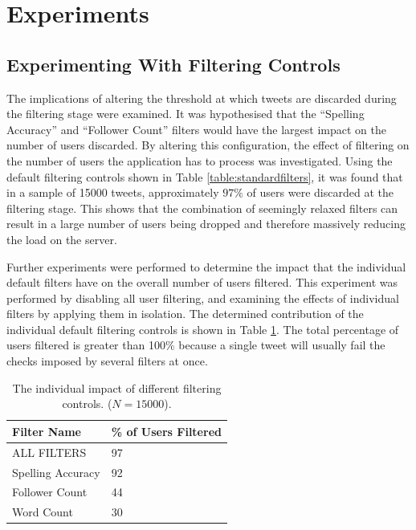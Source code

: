 \documentclass{l4proj}
\begin{document}
\section{Experiments}
    
    \subsection{Experimenting With Filtering Controls}
    The implications of altering the threshold at which tweets are discarded during the filtering stage were examined. It was hypothesised that the ``Spelling Accuracy'' and ``Follower Count'' filters would have the largest impact on the number of users discarded. By altering this configuration, the effect of filtering on the number of users the application has to process was investigated. Using the default filtering controls shown in Table \ref{table:standardfilters}, it was found that in a sample of 15000 tweets, approximately $97\%$ of users were discarded at the filtering stage. This shows that the combination of seemingly relaxed filters can result in a large number of users being dropped and therefore massively reducing the load on the server. 
    
Further experiments were performed to determine the impact that the individual default filters have on the overall number of users filtered. This experiment was performed by disabling all user filtering, and examining the effects of individual filters by applying them in isolation. The determined contribution of the individual default filtering controls is shown in Table \ref{table:filteringresults}. The total percentage of users filtered is greater than 100\% because a single tweet will usually fail the checks imposed by several filters at once.

\begin{table}[H]
    \centering
    \begin{tabular}{| l | l |}
    \hline
    Filter Name & \% of Users Filtered \\ \hline
    ALL FILTERS & 97 \\ \hline
    Spelling Accuracy & 92  \\ \hline
    Follower Count & 44 \\ \hline
    Word Count & 30 \\
    \hline
    \end{tabular}
    \caption{\label{table:filteringresults}The individual impact of different filtering controls. ($N=15000$).}
\end{table}
\end{document}
